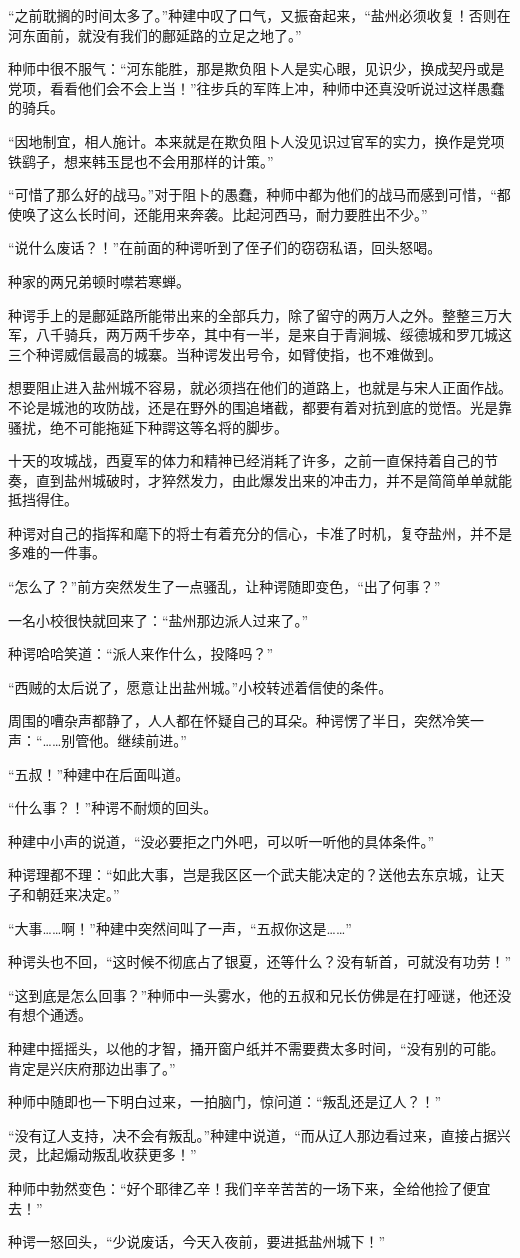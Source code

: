 “之前耽搁的时间太多了。”种建中叹了口气，又振奋起来，“盐州必须收复！否则在河东面前，就没有我们的鄜延路的立足之地了。”

种师中很不服气：“河东能胜，那是欺负阻卜人是实心眼，见识少，换成契丹或是党项，看看他们会不会上当！”往步兵的军阵上冲，种师中还真没听说过这样愚蠢的骑兵。

“因地制宜，相人施计。本来就是在欺负阻卜人没见识过官军的实力，换作是党项铁鹞子，想来韩玉昆也不会用那样的计策。”

“可惜了那么好的战马。”对于阻卜的愚蠢，种师中都为他们的战马而感到可惜，“都使唤了这么长时间，还能用来奔袭。比起河西马，耐力要胜出不少。”

“说什么废话？！”在前面的种谔听到了侄子们的窃窃私语，回头怒喝。

种家的两兄弟顿时噤若寒蝉。

种谔手上的是鄜延路所能带出来的全部兵力，除了留守的两万人之外。整整三万大军，八千骑兵，两万两千步卒，其中有一半，是来自于青涧城、绥德城和罗兀城这三个种谔威信最高的城寨。当种谔发出号令，如臂使指，也不难做到。

想要阻止进入盐州城不容易，就必须挡在他们的道路上，也就是与宋人正面作战。不论是城池的攻防战，还是在野外的围追堵截，都要有着对抗到底的觉悟。光是靠骚扰，绝不可能拖延下种諤这等名将的脚步。

十天的攻城战，西夏军的体力和精神已经消耗了许多，之前一直保持着自己的节奏，直到盐州城破时，才猝然发力，由此爆发出来的冲击力，并不是简简单单就能抵挡得住。

种谔对自己的指挥和麾下的将士有着充分的信心，卡准了时机，复夺盐州，并不是多难的一件事。

“怎么了？”前方突然发生了一点骚乱，让种谔随即变色，“出了何事？”

一名小校很快就回来了：“盐州那边派人过来了。”

种谔哈哈笑道：“派人来作什么，投降吗？”

“西贼的太后说了，愿意让出盐州城。”小校转述着信使的条件。

周围的嘈杂声都静了，人人都在怀疑自己的耳朵。种谔愣了半日，突然冷笑一声：“……别管他。继续前进。”

“五叔！”种建中在后面叫道。

“什么事？！”种谔不耐烦的回头。

种建中小声的说道，“没必要拒之门外吧，可以听一听他的具体条件。”

种谔理都不理：“如此大事，岂是我区区一个武夫能决定的？送他去东京城，让天子和朝廷来决定。”

“大事……啊！”种建中突然间叫了一声，“五叔你这是……”

种谔头也不回，“这时候不彻底占了银夏，还等什么？没有斩首，可就没有功劳！”

“这到底是怎么回事？”种师中一头雾水，他的五叔和兄长仿佛是在打哑谜，他还没有想个通透。

种建中摇摇头，以他的才智，捅开窗户纸并不需要费太多时间，“没有别的可能。肯定是兴庆府那边出事了。”

种师中随即也一下明白过来，一拍脑门，惊问道：“叛乱还是辽人？！”

“没有辽人支持，决不会有叛乱。”种建中说道，“而从辽人那边看过来，直接占据兴灵，比起煽动叛乱收获更多！”

种师中勃然变色：“好个耶律乙辛！我们辛辛苦苦的一场下来，全给他捡了便宜去！”

种谔一怒回头，“少说废话，今天入夜前，要进抵盐州城下！”

